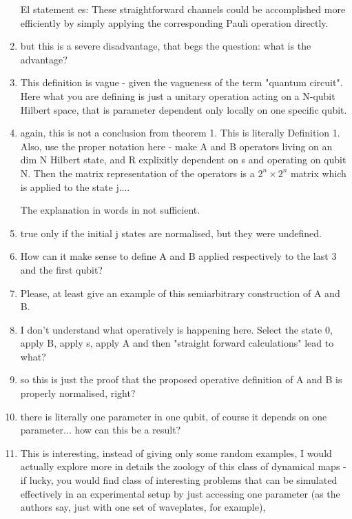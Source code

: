 \documentclass[10pt,letterpaper]{article} %
\begin{document}
\begin{enumerate}
El statement es: These straightforward channels could be accomplished more efficiently by
simply applying the corresponding Pauli operation directly. \\

\item but this is a severe disadvantage, that begs the question: what is the advantage? \\

\item This definition is vague - given the vagueness of the term "quantum circuit".
 Here what you are defining is just a unitary operation acting on a N-qubit Hilbert space, that is parameter dependent only locally on one specific qubit. 
 
\item again, this is not a conclusion from theorem 1. This is literally Definition 1. Also, use the proper notation here - make A and B operators living on an dim N Hilbert state, and R explixitly dependent on s and operating on qubit N. Then the matrix representation of the operators is a $2^n\times 2^n$ matrix which is applied to the state j....


The explanation in words in not sufficient.

\item true only if the initial j states are normalised, but they were undefined.


\item How can it make sense to define A and B applied respectively to the last 3 and the first qubit?

\item  Please, at least give an example of this semiarbitrary construction of A and B.

\item I don't understand what operatively is happening here. Select the state 0, apply B, apply s, apply A and then "straight forward calculations" lead to what?

\item so this is just the proof that the proposed operative definition of A and B is properly normalised, right?

\item there is literally one parameter in one qubit, of course it depends on one parameter...
 how can this be a result?
  
 \item This is interesting, instead of giving only some random examples, I would actually explore more in details the zoology of this class of dynamical maps - if lucky, you would find class of interesting problems that can be simulated effectively in an experimental setup by just accessing one parameter (as the authors say, just with one set of waveplates, for example), 
 

\end{enumerate}
\end{document}
